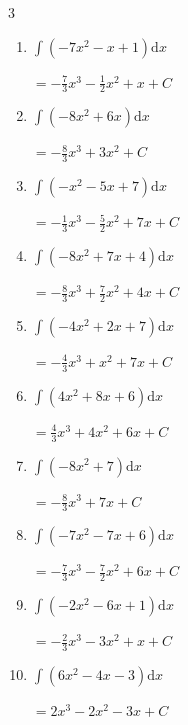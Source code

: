 \begin{multicols}{3}
\begin{enumerate}
        $\displaystyle =-x^{3}+3x^{2}+5x+ C$

  \item $\displaystyle \int \left( -7x^{2}-x+1 \right) \mathrm{d}x$

        $\displaystyle =-\frac{7}{3}x^{3}-\frac{1}{2}x^{2}+x+ C$

\columnbreak %

\resetques

  \item $\displaystyle \int \left( -8x^{2}+6x \right) \mathrm{d}x$

        $\displaystyle =-\frac{8}{3}x^{3}+3x^{2}+ C$

  \item $\displaystyle \int \left( -x^{2}-5x+7 \right) \mathrm{d}x$

        $\displaystyle =-\frac{1}{3}x^{3}-\frac{5}{2}x^{2}+7x+ C$

  \item $\displaystyle \int \left( -8x^{2}+7x+4 \right) \mathrm{d}x$

        $\displaystyle =-\frac{8}{3}x^{3}+\frac{7}{2}x^{2}+4x+ C$

  \item $\displaystyle \int \left( -4x^{2}+2x+7 \right) \mathrm{d}x$

        $\displaystyle =-\frac{4}{3}x^{3}+x^{2}+7x+ C$

  \item $\displaystyle \int \left( 4x^{2}+8x+6 \right) \mathrm{d}x$

        $\displaystyle =\frac{4}{3}x^{3}+4x^{2}+6x+ C$

  \item $\displaystyle \int \left( -8x^{2}+7 \right) \mathrm{d}x$

        $\displaystyle =-\frac{8}{3}x^{3}+7x+ C$

  \item $\displaystyle \int \left( -7x^{2}-7x+6 \right) \mathrm{d}x$

        $\displaystyle =-\frac{7}{3}x^{3}-\frac{7}{2}x^{2}+6x+ C$

  \item $\displaystyle \int \left( -2x^{2}-6x+1 \right) \mathrm{d}x$

        $\displaystyle =-\frac{2}{3}x^{3}-3x^{2}+x+ C$

  \item $\displaystyle \int \left( 6x^{2}-4x-3 \right) \mathrm{d}x$

        $\displaystyle =2x^{3}-2x^{2}-3x+ C$


\end{enumerate}
\end{multicols}
